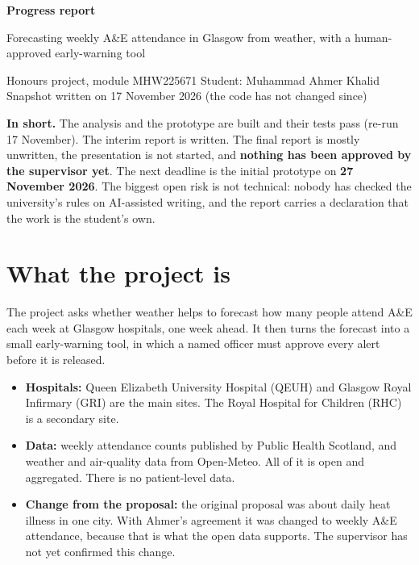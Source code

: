 \documentclass[11pt,a4paper]{article}
\begin{document}
{\LARGE\bfseries\color{ink} Progress report\par}
\vspace{2pt}
{\large Forecasting weekly A\&E attendance in Glasgow from weather, with a human-approved early-warning tool\par}
\vspace{4pt}
Honours project, module MHW225671 \quad Student: Muhammad Ahmer Khalid \quad Snapshot written on 17 November 2026 (the code has not changed since)

\vspace{6pt}
\colorbox{soft}{\parbox{\dimexpr\linewidth-2\fboxsep}{%
\textbf{In short.}
The analysis and the prototype are built and their tests pass (re-run 17 November).
The interim report is written.
The final report is mostly unwritten, the presentation is not started, and \textbf{nothing has been approved by the supervisor yet}.
The next deadline is the initial prototype on \textbf{27 November 2026}.
The biggest open risk is not technical: nobody has checked the university's rules on AI-assisted writing, and the report carries a declaration that the work is the student's own.}}

\section{What the project is}
The project asks whether weather helps to forecast how many people attend A\&E each week at Glasgow hospitals, one week ahead.
It then turns the forecast into a small early-warning tool, in which a named officer must approve every alert before it is released.

\begin{itemize}
\item \textbf{Hospitals:} Queen Elizabeth University Hospital (QEUH) and Glasgow Royal Infirmary (GRI) are the main sites. The Royal Hospital for Children (RHC) is a secondary site.
\item \textbf{Data:} weekly attendance counts published by Public Health Scotland, and weather and air-quality data from Open-Meteo. All of it is open and aggregated. There is no patient-level data.
\item \textbf{Change from the proposal:} the original proposal was about daily heat illness in one city. With Ahmer's agreement it was changed to weekly A\&E attendance, because that is what the open data supports. The supervisor has not yet confirmed this change.
\end{itemize}
\end{document}
